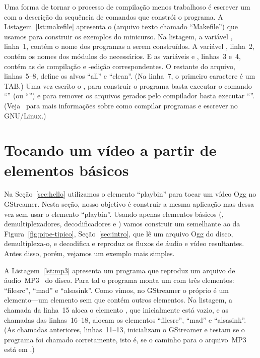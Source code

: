 \documentclass{SBCbookchapter}
\begin{document}
Uma forma de tornar o processo de compilação menos trabalhoso é escrever um
 com a descrição da sequência de comandos que constrói o
programa.  A Listagem~\ref{lst:makefile} apresenta o  (arquivo
texto chamado ``Makefile'') que usamos para construir os exemplos do
minicurso.  Na listagem, a variável , linha~1, contém o nome dos
programas a serem construídos.  A variável , linha~2, contém os
nomes dos módulos do  necessários.  E as variáveis 
e , linhas~3 e~4, contém as  de compilação e
-edição correspondentes.  O restante do arquivo, linhas~5--8,
define os alvos ``all'' e ``clean''.  (Na linha~7, o primeiro caractere é um
TAB\null.)  Uma vez escrito o , para construir o programa basta
executar o comando ``'' (ou ``'') e para remover os
arquivos gerados pelo compilador basta executar ``''.
(Veja~\cite{Gough-B-J-2005,Mecklenburg-R-2005} para mais informações sobre
como compilar programas e escrever  no GNU/Linux.)




\section{Tocando um vídeo a partir de elementos básicos}
\label{sec:dissec}

Na Seção~\ref{sec:hello} utilizamos o elemento ``playbin'' para tocar um
vídeo Ogg no GStreamer.  Nesta seção, nosso objetivo é construir a mesma
aplicação mas dessa vez sem usar o elemento ``playbin''.  Usando apenas
elementos básicos (, demultiplexadores, decodificadores e
) vamos construir um  semelhante ao da
Figura~\ref{fig:pipe-tipico}, Seção~\ref{sec:intro}, que lê um arquivo Ogg
do disco, demultiplexa-o, e decodifica e reproduz os fluxos de áudio e vídeo
resultantes.  Antes disso, porém, vejamos um exemplo mais simples.

A Listagem~\ref{lst:mp3} apresenta um programa que reproduz um arquivo de
áudio~MP3~\cite{mp3} do disco.  Para tal o programa monta um 
com três elementos: ``filesrc'', ``mad'' e ``alsasink''.  Como vimos, no
GStreamer o próprio  é um elemento---um elemento sem 
que contém outros elementos.  Na listagem, a chamada da linha~15 aloca o
elemento , que inicialmente está vazio, e as chamadas das
linhas~16--18, alocam os elementos ``filesrc'', ``mad'' e ``alsasink''.  (As
chamadas anteriores, linhas~11--13, inicializam o GStreamer e testam se o
programa foi chamado corretamente, isto é, se o caminho para o arquivo~MP3
está em .)
\end{document}

